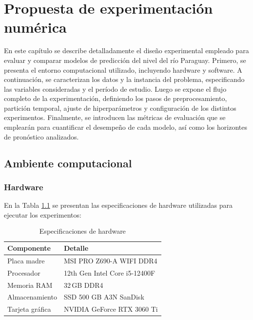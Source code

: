 \clearpage %
\chapter{Propuesta de experimentación
numérica}
\label{sec:Propuesta de experimentación
numérica}

En este capítulo se describe detalladamente el diseño experimental empleado para evaluar y comparar modelos de predicción del nivel del río Paraguay. Primero, se presenta el entorno computacional utilizado, incluyendo hardware y software. A continuación, se caracterizan los datos y la instancia del problema, especificando las variables consideradas y el período de estudio. Luego se expone el flujo completo de la experimentación, definiendo los pasos de preprocesamiento, partición temporal, ajuste de hiperparámetros y configuración de los distintos experimentos. Finalmente, se introducen las métricas de evaluación que se emplearán para cuantificar el desempeño de cada modelo, así como los horizontes de pronóstico analizados.
\section{Ambiente computacional}
\label{sec:ambiente_computacional}

\subsection{Hardware}
\label{ssec:hardware}

En la Tabla \ref{tab:hardware} se presentan las especificaciones de hardware utilizadas para ejecutar los experimentos:

\begin{table}[h]
  \centering
  \caption{Especificaciones de hardware}
  \label{tab:hardware}
  \begin{tabular}{@{}ll@{}}
    \toprule
    \textbf{Componente} & \textbf{Detalle} \\
    \midrule
    Placa madre         & MSI PRO Z690-A WIFI DDR4 \\
    Procesador          & 12th Gen Intel Core i5-12400F \\
    Memoria RAM         & 32\,GB DDR4 \\
    Almacenamiento      & SSD 500 GB A3N SanDisk \\
    Tarjeta gráfica     & NVIDIA GeForce RTX 3060 Ti \\
    \bottomrule
  \end{tabular}
\end{table}

